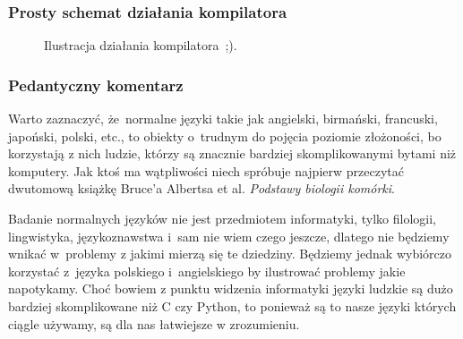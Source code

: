 \documentclass[10pt,t]{beamer}
\begin{document}
\begin{frame}
  \frametitle{Prosty schemat działania kompilatora}


  \begin{figure}


    \caption{Ilustracja działania kompilatora~;).}


  \end{figure}

\end{frame}





\begin{frame}
  \frametitle{Pedantyczny komentarz}


  Warto zaznaczyć, że~normalne języki takie jak angielski, birmański,
  francuski, japoński, polski, etc., to obiekty o~trudnym do pojęcia
  poziomie złożoności, bo korzystają z nich ludzie, którzy są znacznie
  bardziej skomplikowanymi bytami niż komputery. Jak ktoś ma wątpliwości
  niech spróbuje najpierw przeczytać dwutomową książkę Bruce’a Albertsa
  et al. \textit{Podstawy biologii komórki}.

  Badanie normalnych języków nie jest przedmiotem informatyki, tylko
  filologii, lingwistyka, językoznawstwa i~sam nie wiem czego jeszcze,
  dlatego nie będziemy wnikać w~problemy z jakimi mierzą się te dziedziny.
  Będziemy jednak wybiórczo korzystać
  z~języka polskiego i~angielskiego by ilustrować problemy jakie napotykamy.
  Choć bowiem z punktu widzenia informatyki języki ludzkie są dużo bardziej
  skomplikowane niż C czy Python, to ponieważ są to \alert{nasze} języki
  których ciągle używamy, są dla nas łatwiejsze w zrozumieniu.


\end{frame}
\end{document}
